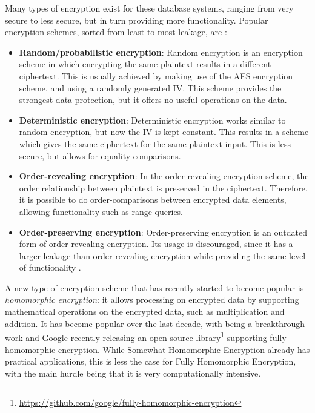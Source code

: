 Many types of encryption exist for these database systems, ranging from very secure to less secure, but in turn providing more functionality. Popular encryption schemes, sorted from least to most leakage, are \citep{cryptdice, datablinder}:
\begin{itemize}
    \item \textbf{Random/probabilistic encryption}: Random encryption is an encryption scheme in which encrypting the same plaintext results in a different ciphertext. This is usually achieved by making use of the AES encryption scheme, and using a randomly generated \gls{IV}. This scheme provides the strongest data protection, but it offers no useful operations on the data.
    \item \textbf{Deterministic encryption}: Deterministic encryption works similar to random encryption, but now the \gls{IV} is kept constant. This results in a scheme which gives the same ciphertext for the same plaintext input. This is less secure, but allows for equality comparisons.
    \item \textbf{Order-revealing encryption}: In the order-revealing encryption scheme, the order relationship between plaintext is preserved in the ciphertext. Therefore, it is possible to do order-comparisons between encrypted data elements, allowing functionality such as range queries.
    \item \textbf{Order-preserving encryption}: Order-preserving encryption is an outdated form of order-revealing encryption. Its usage is discouraged, since it has a larger leakage than order-revealing encryption while providing the same level of functionality \citep{stanford-ore}.
\end{itemize}
A new type of encryption scheme that has recently started to become popular is \textit{homomorphic encryption}: it allows processing on encrypted data by supporting mathematical operations on the encrypted data, such as multiplication and addition. It has become popular over the last decade, with \citet{fhe} being a breakthrough work and Google recently releasing an open-source library\footnote{\url{https://github.com/google/fully-homomorphic-encryption}} supporting fully homomorphic encryption. While Somewhat Homomorphic Encryption already has practical applications, this is less the case for Fully Homomorphic Encryption, with the main hurdle being that it is very computationally intensive.
